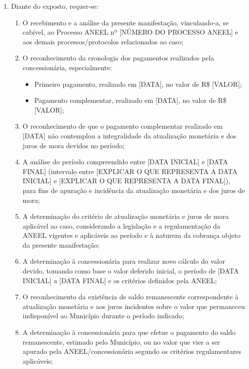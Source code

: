 \begin{enumerate}[resume]
\item Diante do exposto, requer-se:
    \begin{enumerate}
        \item O recebimento e a análise da presente manifestação, vinculando-a, se cabível, ao Processo ANEEL nº [NÚMERO DO PROCESSO ANEEL] e aos demais processos/protocolos relacionados ao caso;

        \item O reconhecimento da cronologia dos pagamentos realizados pela concessionária, especialmente:
        \begin{itemize}
            \item Primeiro pagamento, realizado em [DATA], no valor de R\$ [VALOR];
            \item Pagamento complementar, realizado em [DATA], no valor de R\$ [VALOR];
        \end{itemize}

        \item O reconhecimento de que o pagamento complementar realizado em [DATA] não contemplou a integralidade da atualização monetária e dos juros de mora devidos no período;

        \item A análise do período compreendido entre [DATA INICIAL] e [DATA FINAL] (intervalo entre [EXPLICAR O QUE REPRESENTA A DATA INICIAL] e [EXPLICAR O QUE REPRESENTA A DATA FINAL]), para fins de apuração e incidência da atualização monetária e dos juros de mora;

        \item A determinação do critério de atualização monetária e juros de mora aplicável ao caso, considerando a legislação e a regulamentação da ANEEL vigentes e aplicáveis ao período e à natureza da cobrança objeto da presente manifestação;

        \item A determinação à concessionária para realizar novo cálculo do valor devido, tomando como base o valor deferido inicial, o período de [DATA INICIAL] a [DATA FINAL] e os critérios definidos pela ANEEL;

        \item O reconhecimento da existência de saldo remanescente correspondente à atualização monetária e aos juros incidentes sobre o valor que permaneceu indisponível ao Município durante o período indicado;

        \item A determinação à concessionária para que efetue o pagamento do saldo remanescente, estimado pelo Município, ou no valor que vier a ser apurado pela ANEEL/concessionária segundo os critérios regulamentares aplicáveis;


\end{enumerate}
\end{enumerate}
